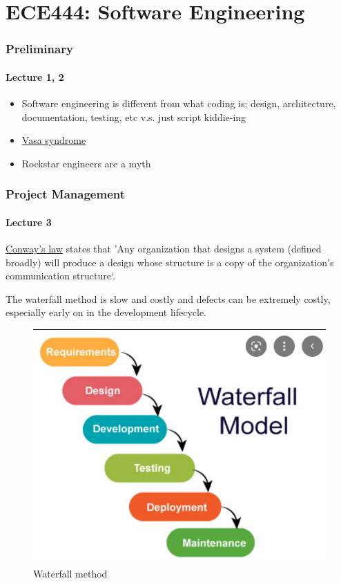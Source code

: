 \documentclass[../notes.tex]{subfiles}
\begin{document}
\part{ECE444: Software Engineering}

\section{Preliminary}
\subsection{Lecture 1, 2}
\begin{itemize}
	\item Software engineering is different from what coding is; design, architecture, documentation, testing, etc v.s. just script kiddie-ing
	\item \href{https://en.wikipedia.org/wiki/Vasa_syndrome}{Vasa syndrome}
	\item Rockstar engineers are a myth
\end{itemize}

\section{Project Management}
\subsection{Lecture 3}

\begin{definition}
	\href{https://en.wikipedia.org/wiki/Conway%27s_law}{Conway's law} states that 'Any organization that designs a system (defined broadly) will produce a design whose structure is a copy of the organization's communication structure`.
\end{definition}


The waterfall method is slow and costly and defects can be extremely costly, especially early on in the development lifecycle.

\begin{figure}[H]
	\centering
	\includegraphics[width=0.8\linewidth]{img/image_2022-09-14-14-35-07.png}
	\caption{Waterfall method}
\end{figure}
\end{document}
